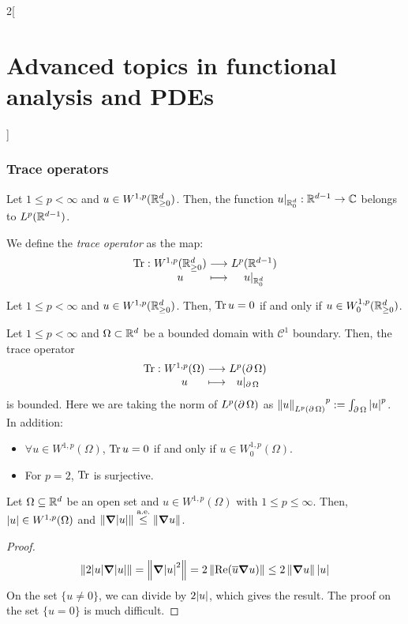 \documentclass[../../../main_math.tex]{subfiles}
\begin{document}
\begin{multicols}{2}[\section{Advanced topics in functional analysis and PDEs}]
  \subsubsection{Trace operators}
  \begin{theorem}
    Let $1\leq p<\infty$ and $u\in W^{1,p}(\mathbb{R}_{\geq 0}^d)$. Then, the function $u|_{\mathbb{R}_0^d}:\mathbb{R}^{d-1}\to\mathbb{C}$ belongs to $L^p(\mathbb{R}^{d-1})$.
  \end{theorem}
  \begin{definition}
    We define the \emph{trace operator} as the map:
    \begin{align*}
      \function{\Tr}{W^{1,p}(\RR_{\geq 0}^d)}{L^p(\RR^{d-1})}{u}{u|_{\RR_0^d}}
    \end{align*}
  \end{definition}
  \begin{theorem}
    Let $1\leq p<\infty$ and $u\in W^{1,p}(\mathbb{R}_{\geq 0}^d)$. Then, $\Tr u=0$ if and only if $u\in W_0^{1,p}(\mathbb{R}_{\geq 0}^d)$.
  \end{theorem}
  \begin{theorem}\label{ATFAPDE:trace_thm}
    Let $1\leq p<\infty$ and $\Omega\subset\mathbb{R}^d$ be a bounded domain with $\mathcal{C}^1$ boundary. Then, the trace operator
    $$
      \function{\Tr}{W^{1,p}(\Omega)}{L^p(\Fr{\Omega})}{u}{u|_{\Fr{\Omega}}}
    $$
    is bounded. Here we are taking the norm of $L^p(\operatorname{\partial}{\Omega})$ as ${\left\|u\right\|_{L^p(\operatorname{\partial}{\Omega})}}^p:=\int_{\operatorname{\partial}{\Omega}}{\abs{u}^p}$. In addition:
    \begin{itemize}
      \item $\forall u\in W^{1,p}(\Omega)$, $\Tr u=0$ if and only if $u\in W_0^{1,p}(\Omega)$.
      \item For $p=2$, $\Tr$ is surjective.
    \end{itemize}
  \end{theorem}
  \begin{lemma}
    Let $\Omega\subseteq \mathbb{R}^d$ be an open set and $u\in W^{1,p}(\Omega)$ with $1\leq p\leq \infty$. Then, $\abs{u}\in W^{1,p}(\Omega)$ and $\left\|\grad \abs{u}\right\|\overset{\text{a.e.}}{\leq}\left\|\grad u\right\|$.
  \end{lemma}
  \begin{proof}
    $$
      \left\|2\abs{u}\grad\abs{u}\right\|=\left\|\grad \abs{u}^2\right\|=2\left\|\Re(\overline{u}\grad u)\right\|\leq 2\left\|\grad u\right\|\abs{u}
    $$
    On the set $\{u\ne 0\}$, we can divide by $2\abs{u}$, which gives the result. The proof on the set $\{u=0\}$ is much difficult.
  \end{proof}
\end{multicols}
\end{document}
